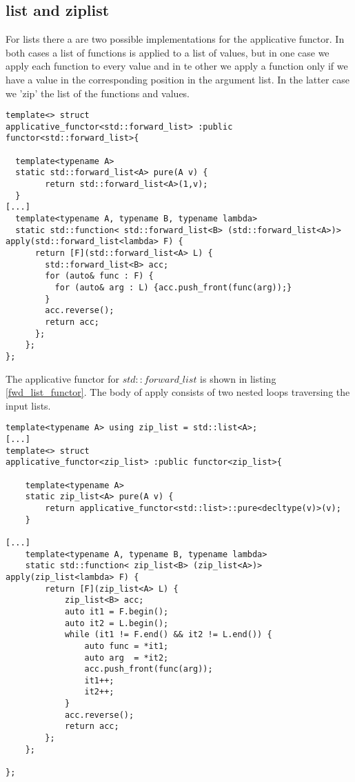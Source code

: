 \documentclass[12pt,fleqn]{article}
\begin{document}
\subsection*{list and ziplist}
For lists there a are two possible implementations for the applicative functor.
In both cases a list of functions is applied to a list of values, but in one case we apply each function to every value and in te other we apply a function 
only if we have a value in the corresponding position in the argument list. 
In the latter case we 'zip' the list of the functions and values.
\begin{lstlisting}[caption=std::forward\_list is an applicative functor, label=fwd_list_functor]
template<> struct 
applicative_functor<std::forward_list> :public functor<std::forward_list>{

  template<typename A>
  static std::forward_list<A> pure(A v) {
		return std::forward_list<A>(1,v);
  }
[...]
  template<typename A, typename B, typename lambda>
  static std::function< std::forward_list<B> (std::forward_list<A>)> apply(std::forward_list<lambda> F) {
      return [F](std::forward_list<A> L) {
	    std::forward_list<B> acc;
	    for (auto& func : F) {
	      for (auto& arg : L) {acc.push_front(func(arg));}
        } 
	    acc.reverse();
	    return acc;
      };
    };
};
\end{lstlisting}
The applicative functor for $std::forward\_list$ is shown in listing \ref{fwd_list_functor}.
The body of apply consists of two nested loops traversing the input lists. 
\begin{lstlisting}[caption=ziplist is an applicative functor, label=zip_list_functor]
template<typename A> using zip_list = std::list<A>;
[...]
template<> struct 
applicative_functor<zip_list> :public functor<zip_list>{

    template<typename A>
    static zip_list<A> pure(A v) {
		return applicative_functor<std::list>::pure<decltype(v)>(v);
    }

[...]
    template<typename A, typename B, typename lambda>
    static std::function< zip_list<B> (zip_list<A>)> apply(zip_list<lambda> F) {
		return [F](zip_list<A> L) {
			zip_list<B> acc;
			auto it1 = F.begin();
			auto it2 = L.begin();
			while (it1 != F.end() && it2 != L.end()) {
				auto func = *it1;
				auto arg  = *it2;
				acc.push_front(func(arg));
				it1++;
				it2++;
			}
			acc.reverse();
			return acc;
		};
	};
	
};
\end{lstlisting}
\end{document}
